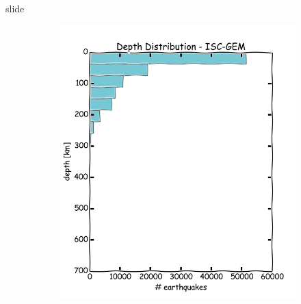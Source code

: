 \documentclass[ucs,8pt]{beamer}
\begin{document}
\begin{frame}{slide}
\begin{figure}[H]
	\begin{subfigure}[b]{0.45\textheight}
		  	\centering
			\includegraphics[height=1.00\textheight]{dep_sa_hist}
			\label{fig:sa_dep_hist}
	\end{subfigure}%
	\quad %
	\begin{subfigure}[b]{0.4\textheight}
		  	\centering

\end{subfigure}
\end{figure}
\end{frame}
\end{document}
